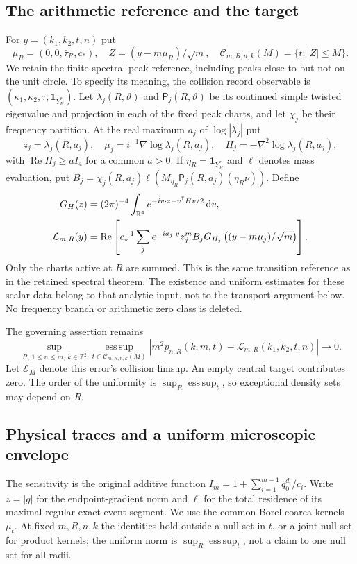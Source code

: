 \documentclass[11pt,reqno]{amsart}
\numberwithin{equation}{section}
\theoremstyle{definition}\newtheorem{definition}[theorem]{Definition}
\theoremstyle{remark}\newtheorem{remark}[theorem]{Remark}
\newcommand{\R}{\mathbb R}\newcommand{\Z}{\mathbb Z}\newcommand{\T}{\mathbb T}
\newcommand{\dd}{\,\mathrm d}\newcommand{\one}{\mathbf1}
\theoremstyle{definition}\newtheorem{inputstatement}[theorem]{Input statement}
\newcommand{\esssup}{\operatorname*{ess\,sup}}
\begin{document}
\subsection{The arithmetic reference and the target}
For $y=(k_1,k_2,t,n)$ put
\[
 \mu_R=(0,0,\bar\tau_R,c_*),\quad
 Z=(y-m\mu_R)/\sqrt m,\quad
 \mathcal C_{m,R,n,k}(M)=\{t:|Z|\le M\}.
\]
We retain the finite spectral-peak reference, including peaks close to
but not on the unit circle. To specify its meaning, the collision
record observable is $(\kappa_1,\kappa_2,\tau,\one_{Y_R^*})$.
Let $\lambda_j(R,\vartheta)$ and $\mathsf P_j(R,\vartheta)$ be its
continued simple twisted eigenvalue and projection in each of the
fixed peak charts, and let $\chi_j$ be their frequency partition.
At the real maximum $a_j$ of $\log|\lambda_j|$ put
\[
 z_j=\lambda_j(R,a_j),\quad
 \mu_j=i^{-1}\nabla\log\lambda_j(R,a_j),\quad
 H_j=-\nabla^2\log\lambda_j(R,a_j),
\]
with $\operatorname{Re}H_j\ge aI_4$ for a common $a>0$. If
$\eta_R=\one_{Y_R^*}$ and $\ell$ denotes mass evaluation, put
$B_j=\chi_j(R,a_j)\ell(M_{\eta_R}\mathsf P_j(R,a_j)(\eta_R\nu))$.
Define
\begin{align}
 G_H(z)&=(2\pi)^{-4}\int_{\R^4}e^{-iv\cdot z-v^{\mathsf T}Hv/2}\dd v,
 \notag\\
 \mathcal L_{m,R}(y)&=\operatorname{Re}\left[
 c_*^{-1}\sum_j e^{-ia_j\cdot y}z_j^m B_j
      G_{H_j}\left((y-m\mu_j)/\sqrt m\right)\right].
 \label{eq:v76-reference}
\end{align}
Only the charts active at $R$ are summed. This is the same transition
reference as in the retained spectral theorem. The existence and
uniform estimates for these scalar data belong to that analytic
input, not to the transport argument below. No frequency branch or
arithmetic zero class is deleted.

The governing assertion remains
\begin{equation}\label{eq:v76-target}
 \sup_{R,\,1\le n\le m,\,k\in\Z^2}
 \esssup_{t\in\mathcal C_{m,R,n,k}(M)}
 |m^2p_{n,R}(k,m,t)-\mathcal L_{m,R}(k_1,k_2,t,n)|\longrightarrow0.
\end{equation}
Let $\mathcal E_M$ denote this error's collision limsup. An empty
central target contributes zero. The order of the uniformity is
$\sup_R\esssup_t$, so exceptional density sets may depend on $R$.

\subsection{Physical traces and a uniform microscopic envelope}
The sensitivity is the original additive function
$I_m=1+\sum_{i=1}^{m-1}q_0^{d_i}/c_i$. Write $z=|g|$ for the
endpoint-gradient norm and $\ell$ for the total residence of its
maximal regular exact-event segment. We use the common Borel coarea
kernels $\mu_t$. At fixed $m,R,n,k$ the identities hold outside a
null set in $t$, or a joint null set for product kernels; the uniform
norm is $\sup_R\esssup_t$, not a claim to one null set for all radii.
\end{document}
